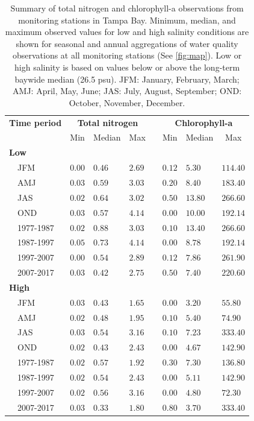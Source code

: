 \documentclass[]{article}
\begin{document}
\begin{table}[!tbp]
\caption{Summary of total nitrogen and chlorophyll-a observations from monitoring stations in Tampa Bay.  Minimum, median, and maximum observed values for low and high salinity conditions are shown for seasonal and annual aggregations of water quality observations at all monitoring stations (See \cref{fig:map}).  Low or high salinity is based on values below or above the long-term baywide median (26.5 psu). JFM: January, February, March; AMJ: April, May, June; JAS: July, August, September; OND: October, November, December.\label{tab:statsum}} 
\begin{center}
\begin{tabular}{llllclll}
\hline\hline
\multicolumn{1}{l}{\bfseries Time period}&\multicolumn{3}{c}{\bfseries Total nitrogen}&\multicolumn{1}{c}{\bfseries }&\multicolumn{3}{c}{\bfseries Chlorophyll-a}\tabularnewline
\cline{2-4} \cline{6-8}
\multicolumn{1}{l}{}&\multicolumn{1}{c}{Min}&\multicolumn{1}{c}{Median}&\multicolumn{1}{c}{Max}&\multicolumn{1}{c}{}&\multicolumn{1}{c}{Min}&\multicolumn{1}{c}{Median}&\multicolumn{1}{c}{Max}\tabularnewline
\hline
{\bfseries Low}&&&&&&&\tabularnewline
~~JFM&$0.00$&$0.46$&$2.69$&&$0.12$&$ 5.30$&$114.40$\tabularnewline
~~AMJ&$0.03$&$0.59$&$3.03$&&$0.20$&$ 8.40$&$183.40$\tabularnewline
~~JAS&$0.02$&$0.64$&$3.02$&&$0.50$&$13.80$&$266.60$\tabularnewline
~~OND&$0.03$&$0.57$&$4.14$&&$0.00$&$10.00$&$192.14$\tabularnewline
~~1977-1987&$0.02$&$0.88$&$3.03$&&$0.10$&$13.40$&$266.60$\tabularnewline
~~1987-1997&$0.05$&$0.73$&$4.14$&&$0.00$&$ 8.78$&$192.14$\tabularnewline
~~1997-2007&$0.00$&$0.54$&$2.89$&&$0.12$&$ 7.86$&$261.90$\tabularnewline
~~2007-2017&$0.03$&$0.42$&$2.75$&&$0.50$&$ 7.40$&$220.60$\tabularnewline
\hline
{\bfseries High}&&&&&&&\tabularnewline
~~JFM&$0.03$&$0.43$&$1.65$&&$0.00$&$ 3.20$&$ 55.80$\tabularnewline
~~AMJ&$0.02$&$0.48$&$1.95$&&$0.10$&$ 5.40$&$ 74.90$\tabularnewline
~~JAS&$0.03$&$0.54$&$3.16$&&$0.10$&$ 7.23$&$333.40$\tabularnewline
~~OND&$0.02$&$0.43$&$2.43$&&$0.00$&$ 4.67$&$142.90$\tabularnewline
~~1977-1987&$0.02$&$0.57$&$1.92$&&$0.30$&$ 7.30$&$136.80$\tabularnewline
~~1987-1997&$0.02$&$0.54$&$2.43$&&$0.00$&$ 5.11$&$142.90$\tabularnewline
~~1997-2007&$0.02$&$0.56$&$3.16$&&$0.00$&$ 4.80$&$ 72.30$\tabularnewline
~~2007-2017&$0.03$&$0.33$&$1.80$&&$0.80$&$ 3.70$&$333.40$\tabularnewline
\hline
\end{tabular}\end{center}
\end{table}

\clearpage
\end{document}

